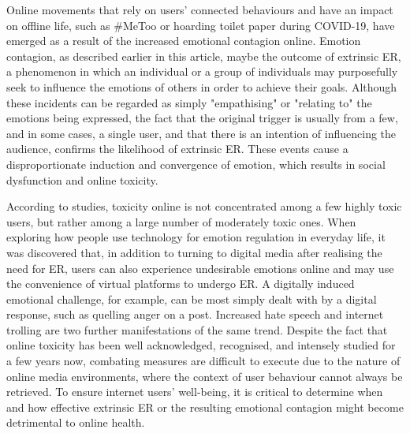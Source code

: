 \documentclass[lettersize,journal]{IEEEtran}
\begin{document}
Online movements that rely on users' connected behaviours and have an impact on offline life, such as \#MeToo or hoarding toilet paper during COVID-19, have emerged as a result of the increased emotional contagion online. Emotion contagion, as described earlier in this article, maybe the outcome of extrinsic ER, a phenomenon in which an individual or a group of individuals may purposefully seek to influence the emotions of others in order to achieve their goals. Although these incidents can be regarded as simply "empathising" or "relating to" the emotions being expressed, the fact that the original trigger is usually from a few, and in some cases, a single user, and that there is an intention of influencing the audience, confirms the likelihood of extrinsic ER. These events cause a disproportionate induction and convergence of emotion, which results in social dysfunction and online toxicity.
 
According to studies, toxicity online is not concentrated among a few highly toxic users, but rather among a large number of moderately toxic ones. When exploring how people use technology for emotion regulation in everyday life, it was discovered that, in addition to turning to digital media after realising the need for ER, users can also experience undesirable emotions online and may use the convenience of virtual platforms to undergo ER. A digitally induced emotional challenge, for example, can be most simply dealt with by a digital response, such as quelling anger on a post. Increased hate speech and internet trolling are two further manifestations of the same trend. Despite the fact that online toxicity has been well acknowledged, recognised, and intensely studied for a few years now, combating measures are difficult to execute due to the nature of online media environments, where the context of user behaviour cannot always be retrieved. To ensure internet users' well-being, it is critical to determine when and how effective extrinsic ER or the resulting emotional contagion might become detrimental to online health.


\end{document}
